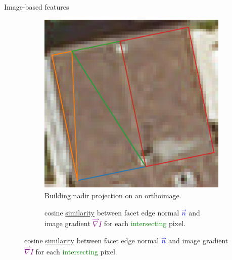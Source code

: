\documentclass[10pt, export]{beamer}
\begin{document}
            \begin{frame}{Image-based features}
                \begin{figure}
                    \begin{subfigure}{.48\textwidth}
                        \includegraphics[width=.9\textwidth]{images/radio_vector}
                        \caption{\label{fig::ortho_sup} Building nadir projection on an orthoimage.}
                    \end{subfigure}
                    \begin{subfigure}{.48\textwidth}
                        
                        \caption{\label{fig::hist} cosine \underline{similarity} between facet edge normal \textcolor{blue}{$\vec n$} and image gradient \textcolor{purple}{$\vec \nabla I$} for each \textcolor{green}{intersecting} pixel.}
                    \end{subfigure}
                \end{figure}
            \end{frame}
\end{document}
